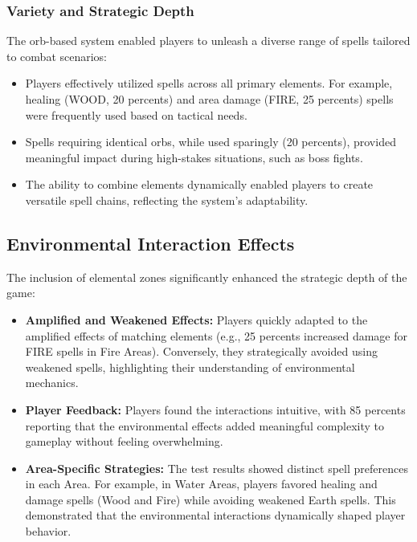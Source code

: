 \documentclass[10pt,twocolumn]{article}
\begin{document}
\subsubsection{Variety and Strategic Depth} The orb-based system enabled players to unleash a diverse range of spells tailored to combat scenarios: 
\begin{itemize} 
    \item Players effectively utilized spells across all primary elements. For example, healing (WOOD, 20 percents) and area damage (FIRE, 25 percents) spells were frequently used based on tactical needs. 
    \item Spells requiring identical orbs, while used sparingly (20 percents), provided meaningful impact during high-stakes situations, such as boss fights. 
    \item The ability to combine elements dynamically enabled players to create versatile spell chains, reflecting the system’s adaptability. 
\end{itemize}

\subsection{Environmental Interaction Effects} The inclusion of elemental zones significantly enhanced the strategic depth of the game: \begin{itemize} 
    \item \textbf{Amplified and Weakened Effects:} Players quickly adapted to the amplified effects of matching elements (e.g., 25 percents increased damage for FIRE spells in Fire Areas). Conversely, they strategically avoided using weakened spells, highlighting their understanding of environmental mechanics. 
    \item \textbf{Player Feedback:} Players found the interactions intuitive, with 85 percents reporting that the environmental effects added meaningful complexity to gameplay without feeling overwhelming. 
    \item \textbf{Area-Specific Strategies:} The test results showed distinct spell preferences in each Area. For example, in Water Areas, players favored healing and damage spells (Wood and Fire) while avoiding weakened Earth spells. This demonstrated that the environmental interactions dynamically shaped player behavior. 
\end{itemize}
\end{document}

